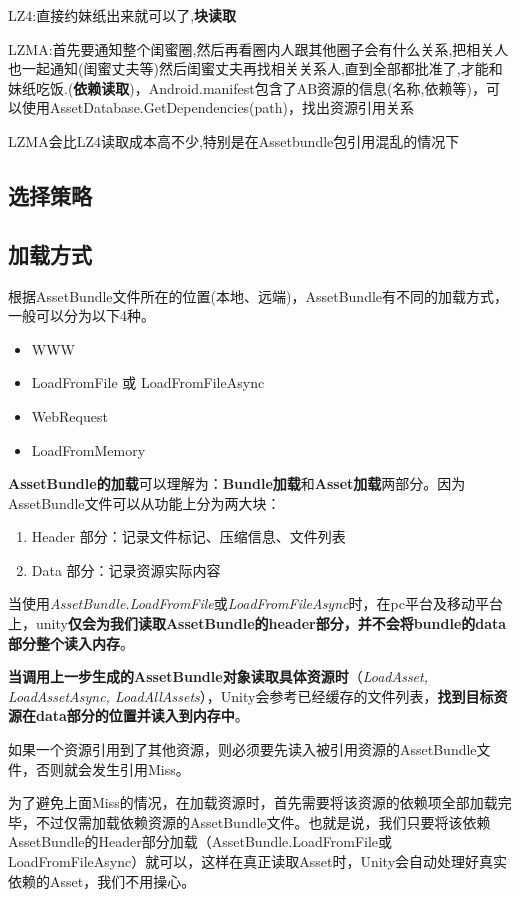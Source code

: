 \documentclass[UTF8,a4paper,12pt]{ctexbook}
\begin{document}
				LZ4:直接约妹纸出来就可以了,\textbf{块读取}
			
				LZMA:首先要通知整个闺蜜圈,然后再看圈内人跟其他圈子会有什么关系,把相关人也一起通知(闺蜜丈夫等)然后闺蜜丈夫再找相关关系人,直到全部都批准了,才能和妹纸吃饭.(\textbf{依赖读取})，Android.manifest包含了AB资源的信息(名称,依赖等)，可以使用AssetDatabase.GetDependencies(path)，找出资源引用关系
				

				LZMA会比LZ4读取成本高不少,特别是在Assetbundle包引用混乱的情况下
				
				
			\subsection{选择策略}
				
				
		\subsection{加载方式}   
			根据AssetBundle文件所在的位置(本地、远端)，AssetBundle有不同的加载方式，一般可以分为以下4种。
			\begin{itemize}
				\item WWW
				\item LoadFromFile 或 LoadFromFileAsync
				\item WebRequest
				\item LoadFromMemory
			\end{itemize} 
			
			\textbf{AssetBundle的加载}可以理解为：\textbf{Bundle加载}和\textbf{Asset加载}两部分。因为AssetBundle文件可以从功能上分为两大块：
			\begin{enumerate}
				\item Header 部分：记录文件标记、压缩信息、文件列表
				\item Data 部分：记录资源实际内容
			\end{enumerate}
			
			当使用\textit{AssetBundle.LoadFromFile}或\textit{LoadFromFileAsync}时，在pc平台及移动平台上，unity\textbf{仅会为我们读取AssetBundle的header部分，并不会将bundle的data部分整个读入内存}。
			
			\textbf{当调用上一步生成的AssetBundle对象读取具体资源时}（\textit{LoadAsset, LoadAssetAsync, LoadAllAssets}），Unity会参考已经缓存的文件列表，\textbf{找到目标资源在data部分的位置并读入到内存中}。

			如果一个资源引用到了其他资源，则必须要先读入被引用资源的AssetBundle文件，否则就会发生引用Miss。
			
			为了避免上面Miss的情况，在加载资源时，首先需要将该资源的依赖项全部加载完毕，不过仅需加载依赖资源的AssetBundle文件。也就是说，我们只要将该依赖AssetBundle的Header部分加载（AssetBundle.LoadFromFile或LoadFromFileAsync）就可以，这样在真正读取Asset时，Unity会自动处理好真实依赖的Asset，我们不用操心。
			
\end{document}

